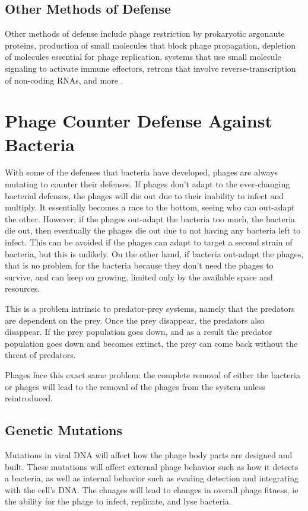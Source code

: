 \subsection{Other Methods of Defense}
Other methods of defense include phage restriction by prokaryotic argonaute proteins, production of small molecules that block phage propagation, depletion of molecules essential for phage replication, systems that use small molecule signaling to activate immune effectors, retrons that involve reverse-transcription of non-coding RNAs, and more \cite{stokar-avihailDiscoveryPhageDeterminants2023}.


\section{Phage Counter Defense Against Bacteria}
With some of the defenses that bacteria have developed, phages are always mutating to counter their defenses. 
If phages don't adapt to the ever-changing bacterial defenses, the phages will die out due to their inability to infect and multiply. 
It essentially becomes a race to the bottom, seeing who can out-adapt the other. 
However, if the phages out-adapt the bacteria too much, the bacteria die out, then eventually the phages die out due to not having any bacteria left to infect. \newline
This can be avoided if the phages can adapt to target a second strain of bacteria, but this is unlikely. 
On the other hand, if bacteria out-adapt the phages, that is no problem for the bacteria because they don't need the phages to survive, and can keep on growing, limited only by the available space and resources. 

This is a problem intrinsic to predator-prey systems, namely that the predators are dependent on the prey. 
Once the prey disappear, the predators also disappear. 
If the prey population goes down, and as a result the predator population goes down and becomes extinct, the prey can come back without the threat of predators. 

Phages face this exact same problem: the complete removal of either the bacteria or phages will lead to the removal of the phages from the system unless reintroduced. 

\subsection{Genetic Mutations}
Mutations in viral DNA will affect how the phage body parts are designed and built. 
These mutations will affect external phage behavior such as how it detects a bacteria, as well as internal behavior such as evading detection and integrating with the cell's DNA. 
The chnages will lead to changes in overall phage fitness, ie the ability for the phage to infect, replicate, and lyse bacteria. 


